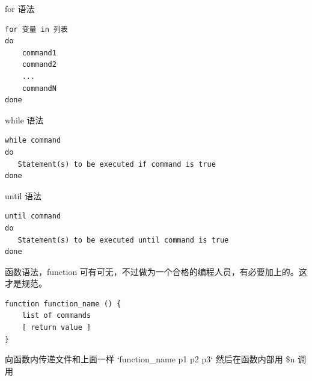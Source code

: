 for 语法

\begin{lstlisting}
for 变量 in 列表
do
    command1
    command2
    ...
    commandN
done
\end{lstlisting}

while 语法

\begin{lstlisting}
while command
do
   Statement(s) to be executed if command is true
done
\end{lstlisting}

 until 语法

\begin{lstlisting}
until command
do
   Statement(s) to be executed until command is true
done
\end{lstlisting}

函数语法，function 可有可无，不过做为一个合格的编程人员，有必要加上的。这才是规范。

\begin{lstlisting}
function function_name () {
    list of commands
    [ return value ]
}
\end{lstlisting}

向函数内传递文件和上面一样 `function_name p1 p2 p3` 然后在函数内部用  \$n 调用





